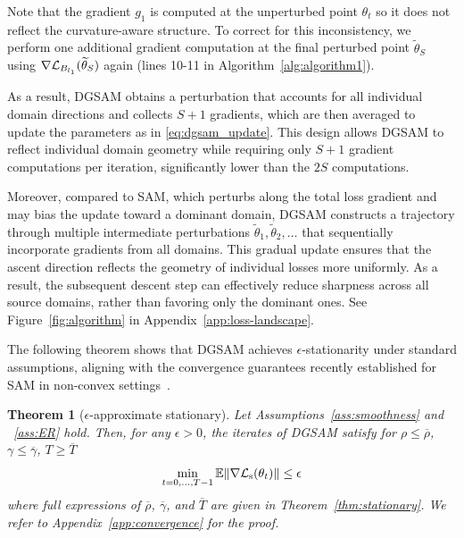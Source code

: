 \documentclass{article}
\theoremstyle{plain}
\newtheorem{theorem}{Theorem}[section]
\theoremstyle{definition}
\theoremstyle{remark}
\newcommand{\no}[1]{{\left\lVert #1 \right\rVert}}
\begin{document}
Note that the gradient $g_1$ is computed at the unperturbed point $\theta_t$ so it does not reflect the curvature-aware structure. To correct for this inconsistency, we perform one additional gradient computation at the final perturbed point $\widetilde \theta_S$ using $\nabla {\mathcal{L}}_{B_{l_1}}(\widetilde \theta_S)$ again (lines 10-11 in Algorithm~\ref{alg:algorithm1}).

As a result, DGSAM obtains a perturbation that accounts for all individual domain directions and collects $S+1$ gradients, which are then averaged to update the parameters  as in \eqref{eq:dgsam_update}. This design allows DGSAM to reflect individual domain geometry while requiring only \(S+1\) gradient computations per iteration, significantly lower than the $2S$ computations. 

Moreover, compared to SAM, which perturbs along the total loss gradient and may bias the update toward a dominant domain, DGSAM constructs a trajectory through multiple intermediate perturbations $\tilde{\theta}_1, \tilde{\theta}_2, \dots$ that sequentially incorporate gradients from all domains. This gradual update ensures that the ascent direction reflects the geometry of individual losses more uniformly. As a result, the subsequent descent step can effectively reduce sharpness across all source domains, rather than favoring only the dominant ones. See Figure~\ref{fig:algorithm} in Appendix~\ref{app:loss-landscape}.

The following theorem shows that DGSAM achieves $\epsilon$-stationarity under standard assumptions, aligning with the convergence guarantees recently established for SAM in non-convex settings~\cite{oikonomou2025sam_convergence}. 
\begin{theorem}[\(\epsilon\)-approximate stationary]
    Let Assumptions~\ref{ass:smoothness} and ~\ref{ass:ER} hold. Then, for any \(\epsilon > 0\), the iterates of DGSAM satisfy for \(\rho\leq \overline{\rho}\), \(\gamma\leq\overline{\gamma}\), $T\geq \overline T$
    \[
     \min_{t=0,\dots,T-1} \E\no{\nabla\gL_{\text{s}}(\theta_t)} \leq \epsilon
    \]
    where full expressions of $\overline\rho$, $\overline\gamma$, and $\overline T$ are given in Theorem~\ref{thm:stationary}. We refer to Appendix~\ref{app:convergence} for the proof. 
\end{theorem}
\end{document}
